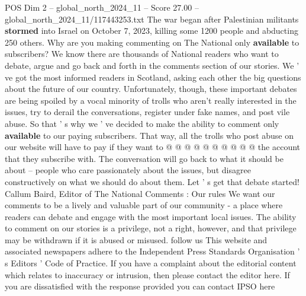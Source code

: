 \begin{textsample}{POS Dim 2 – global\_north\_2024\_11 – Score 27.00 – global\_north\_2024\_11/117443253.txt}
The war began after Palestinian militants \textbf{stormed} into Israel on October 7, 2023, killing some 1200 people and abducting 250 others.
Why are you making commenting on The National only \textbf{available} to subscribers?
We know there are thousands of National readers who want to debate, argue and go back and forth in the comments section of our stories.
We ' ve got the most informed readers in Scotland, asking each other the big questions about the future of our country.
Unfortunately, though, these important debates are being spoiled by a vocal minority of trolls who aren't really interested in the issues, try to derail the conversations, register under fake names, and post vile abuse.
So that ' s why we ' ve decided to make the ability to comment only \textbf{available} to our paying subscribers.
That way, all the trolls who post abuse on our website will have to pay if they want to @ @ @ @ @ @ @ @ @ @ the account that they subscribe with.
The conversation will go back to what it should be about -- people who care passionately about the issues, but disagree constructively on what we should do about them.
Let ' s get that debate started!
Callum Baird, Editor of The National Comments : Our rules We want our comments to be a lively and valuable part of our community - a place where readers can debate and engage with the most important local issues.
The ability to comment on our stories is a privilege, not a right, however, and that privilege may be withdrawn if it is abused or misused. follow us This website and associated newspapers adhere to the Independent Press Standards Organisation ' s Editors ' Code of Practice.
If you have a complaint about the editorial content which relates to inaccuracy or intrusion, then please contact the editor here.
If you are dissatisfied with the response provided you can contact IPSO here

\end{textsample}
